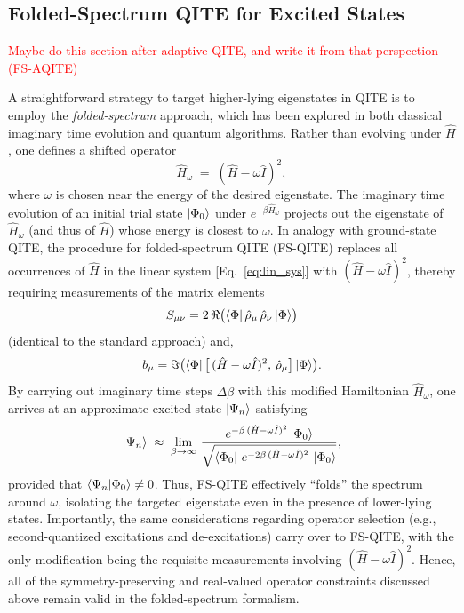 \documentclass[aip,jcp,amsmath,amssymb, reprint]{revtex4-1}
\newcommand{\note}[2]{%
  \ifthenelse{\boolean{shownotes}}%
    {\textcolor{#1}{#2}}%
    {}%
}
\begin{document}
\subsection{Folded-Spectrum QITE for Excited States}
\note{red}{Maybe do this section after adaptive QITE, and write it from that perspection (FS-AQITE)}
A straightforward strategy to target higher-lying eigenstates in QITE is to employ the \textit{folded-spectrum} approach, which has been explored in both classical imaginary time evolution and quantum algorithms.\cite{Tsuchimochi2023Improved,McClean:2016bs,santagati2018witnessing,zhang2021adaptive} Rather than evolving under $\hat{H}$, one defines a shifted operator
\begin{equation}
\hat{H}_\omega \;=\; (\hat{H} - \omega \hat{I})^2,
\end{equation}
where $\omega$ is chosen near the energy of the desired eigenstate.\cite{booth2012communication} The imaginary time evolution of an initial trial state $\ket{\Phi_0}$ under $e^{-\beta \hat{H}_\omega}$ projects out the eigenstate of $\hat{H}_\omega$ (and thus of $\hat{H}$) whose energy is closest to $\omega$. In analogy with ground-state QITE, the procedure for folded-spectrum QITE (FS-QITE) replaces all occurrences of $\hat{H}$ in the linear system [Eq.~\eqref{eq:lin_sys}] with $(\hat{H} - \omega \hat{I})^2$, thereby requiring measurements of the matrix elements
\begin{equation}
S_{\mu \nu} = 2\,\Re\bigl(\bra{\Phi} \hat{\rho}_\mu \,\hat{\rho}_\nu \ket{\Phi}\bigr)
\end{equation}
(identical to the standard approach) and,
\begin{equation}
b_{\mu} = \Im\bigl(\bra{\Phi} \bigl[\,(\hat{H}-\omega\hat{I})^2,\, \hat{\rho}_\mu\bigr]\ket{\Phi}\bigr).
\end{equation}
By carrying out imaginary time steps $\Delta \beta$ with this modified Hamiltonian $\hat{H}_\omega$, one arrives at an approximate excited state $\ket{\Psi_n}$ satisfying
\begin{equation}
\ket{\Psi_n} \;\approx\; \lim_{\beta\to\infty}\,\frac{e^{-\beta\,(\hat{H}-\omega\hat{I})^2}\ket{\Phi_0}}
{\sqrt{\bra{\Phi_0}\,e^{-2\beta\,(\hat{H}-\omega\hat{I})^2}\,\ket{\Phi_0}}},
\end{equation}
provided that $\braket{\Psi_n|\Phi_0}\neq 0$. Thus, FS-QITE effectively “folds” the spectrum around $\omega$, isolating the targeted eigenstate even in the presence of lower-lying states. Importantly, the same considerations regarding operator selection (e.g., second-quantized excitations and de-excitations) carry over to FS-QITE, with the only modification being the requisite measurements involving $(\hat{H}-\omega\hat{I})^2$. Hence, all of the symmetry-preserving and real-valued operator constraints discussed above remain valid in the folded-spectrum formalism.
\end{document}
